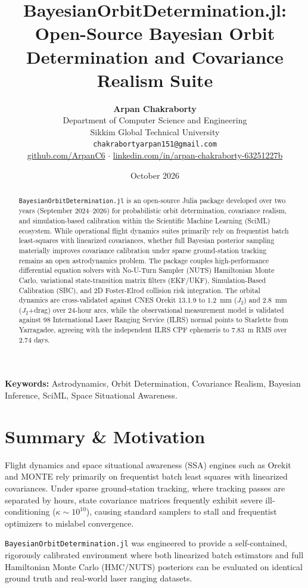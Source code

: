 \documentclass[11pt,a4paper]{article}
\title{\textbf{BayesianOrbitDetermination.jl: Open-Source Bayesian Orbit Determination and Covariance Realism Suite}}
\author{
  \textbf{Arpan Chakraborty} \\
  Department of Computer Science and Engineering \\
  Sikkim Global Technical University \\
  \texttt{chakrabortyarpan151@gmail.com} \\
  \href{https://github.com/ArpanC6}{github.com/ArpanC6} $\cdot$ \href{https://www.linkedin.com/in/arpan-chakraborty-63251227b/}{linkedin.com/in/arpan-chakraborty-63251227b}
}
\date{October 2026}
\begin{document}
\maketitle

\begin{abstract}
\noindent \texttt{BayesianOrbitDetermination.jl} is an open-source Julia package developed over two years (September 2024--2026) for probabilistic orbit determination, covariance realism, and simulation-based calibration within the Scientific Machine Learning (SciML) ecosystem. While operational flight dynamics suites primarily rely on frequentist batch least-squares with linearized covariances, whether full Bayesian posterior sampling materially improves covariance calibration under sparse ground-station tracking remains an open astrodynamics problem. The package couples high-performance differential equation solvers with No-U-Turn Sampler (NUTS) Hamiltonian Monte Carlo, variational state-transition matrix filters (EKF/UKF), Simulation-Based Calibration (SBC), and 2D Foster-Elrod collision risk integration. The orbital dynamics are cross-validated against CNES Orekit 13.1.9 to 1.2~mm ($J_2$) and 2.8~mm ($J_2$+drag) over 24-hour arcs, while the observational measurement model is validated against 98 International Laser Ranging Service (ILRS) normal points to Starlette from Yarragadee, agreeing with the independent ILRS CPF ephemeris to 7.83~m RMS over 2.74 days.
\end{abstract}

\vspace{0.5em}
\noindent \textbf{Keywords:} Astrodynamics, Orbit Determination, Covariance Realism, Bayesian Inference, SciML, Space Situational Awareness.

\section{Summary \& Motivation}

Flight dynamics and space situational awareness (SSA) engines such as Orekit and MONTE rely primarily on frequentist batch least squares with linearized covariances. Under sparse ground-station tracking, where tracking passes are separated by hours, state covariance matrices frequently exhibit severe ill-conditioning ($\kappa \sim 10^{10}$), causing standard samplers to stall and frequentist optimizers to mislabel convergence.

\texttt{BayesianOrbitDetermination.jl} was engineered to provide a self-contained, rigorously calibrated environment where both linearized batch estimators and full Hamiltonian Monte Carlo (HMC/NUTS) posteriors can be evaluated on identical ground truth and real-world laser ranging datasets.
\end{document}
